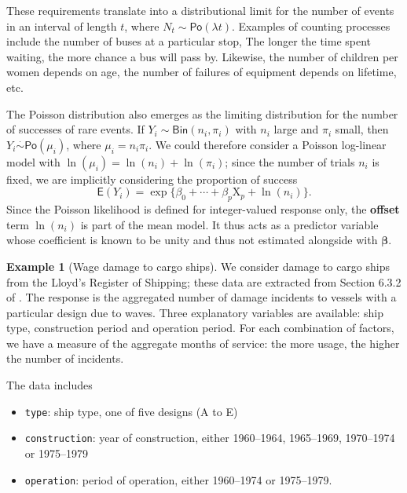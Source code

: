 \documentclass[
  11pt,
  letterpaper,
]{book}
\providecommand{\tightlist}{%
  \setlength{\itemsep}{0pt}\setlength{\parskip}{0pt}}
\theoremstyle{definition}
\theoremstyle{definition}
\newtheorem{example}{Example}[chapter]
\theoremstyle{definition}
\theoremstyle{definition}
\theoremstyle{remark}
\begin{document}
These requirements translate into a distributional limit for the number of events in an interval of length \(t\), where \(N_t \sim \mathsf{Po}(\lambda t)\).
Examples of counting processes include the number of buses at a particular stop,
The longer the time spent waiting, the more chance a bus will pass by. Likewise, the number of children per women depends on age, the number of failures of equipment depends on lifetime, etc.

The Poisson distribution also emerges as the limiting distribution for the number of successes of rare events. If \(Y_i \sim \mathsf{Bin}(n_i, \pi_i)\) with \(n_i\) large and \(\pi_i\) small, then \(Y_i \stackrel{\cdot}{\sim} \mathsf{Po}(\mu_i)\), where \(\mu_i = n_i\pi_i\). We could therefore consider a Poisson log-linear model with \(\ln(\mu_i)=\ln(n_i) + \ln(\pi_i)\); since the number of trials \(n_i\) is fixed, we are implicitly considering the proportion of success
\[\mathsf{E}\left( {Y_i}\right) = \exp\{\beta_0 + \cdots + \beta_p\mathrm{X}_p + \ln(n_i)\}.\]
Since the Poisson likelihood is defined for integer-valued response only, the \textbf{offset} term \(\ln(n_i)\) is part of the mean model. It thus acts as a predictor variable whose coefficient is known to be unity and thus not estimated alongside with \(\boldsymbol{\beta}\).

\begin{example}[Wage damage to cargo ships]
\protect\hypertarget{exm:waveoffset}{}\label{exm:waveoffset}We consider damage to cargo ships from the Lloyd's Register of Shipping; these data are extracted from Section 6.3.2 of \citet{McCullagh/Nelder:1989}. The response is the aggregated number of damage incidents to vessels with a particular design due to waves. Three explanatory variables are available: ship type, construction period and operation period. For each combination of factors, we have a measure of the aggregate months of service: the more usage, the higher the number of incidents.
\end{example}

The data includes

\begin{itemize}
\tightlist
\item
  \texttt{type}: ship type, one of five designs (A to E)
\item
  \texttt{construction}: year of construction, either 1960--1964, 1965--1969, 1970--1974 or 1975--1979
\item
  \texttt{operation}: period of operation, either 1960--1974 or 1975--1979.
\end{itemize}
\end{document}
